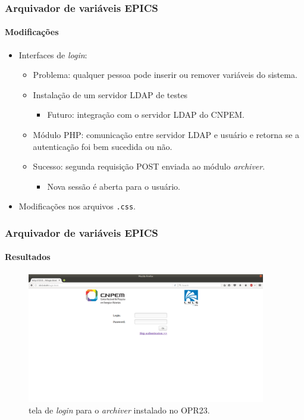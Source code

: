 \begin{frame}
\frametitle {Arquivador de variáveis EPICS}
\framesubtitle{Modificações}

\begin{itemize}
  \item Interfaces de \textit{login}:
  \begin{itemize}
    \item Problema: qualquer pessoa pode inserir ou remover variáveis do
    sistema.
    \vspace{8pt}
    \item Instalação de um servidor LDAP de testes
    	\begin{itemize}
    	  \item Futuro: integração com o servidor LDAP do CNPEM.
    	\end{itemize}
    \vspace{8pt}
    \item Módulo PHP: comunicação entre servidor LDAP e usuário e
    retorna se a autenticação foi bem sucedida ou não.
    \vspace{8pt}
    \item Sucesso: segunda requisição POST enviada ao módulo \textit{archiver}.
    \begin{itemize}
      \item Nova sessão é aberta para o usuário.
    \end{itemize}
  \end{itemize}
  \vspace{8pt}
  \item Modificações nos arquivos \texttt{.css}.
\end{itemize}

\end{frame}


\begin{frame}
\frametitle {Arquivador de variáveis EPICS}
\framesubtitle{Resultados}

\begin{figure}[h]

\centering
\includegraphics[width=0.93\textwidth]{image/login}
\caption {tela de \textit{login} para o \textit{archiver} instalado no OPR23.}
\label{fig:login}
\end{figure}

\end{frame}

